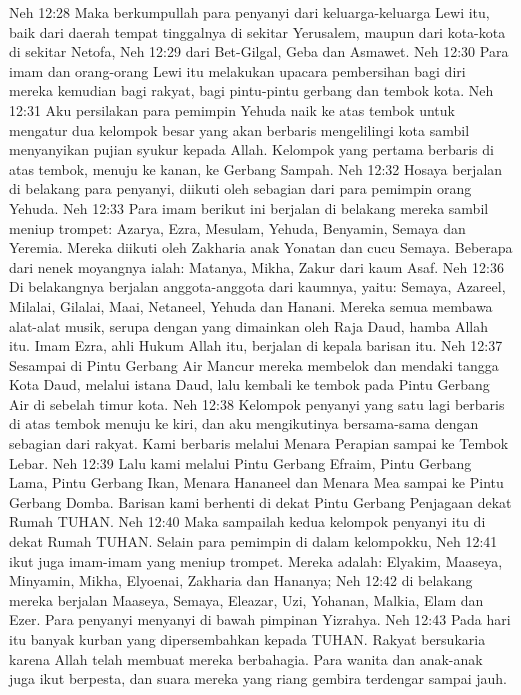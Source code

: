 Neh 12:28  Maka berkumpullah para penyanyi dari keluarga-keluarga Lewi itu, baik dari daerah tempat tinggalnya di sekitar Yerusalem, maupun dari kota-kota di sekitar Netofa,
Neh 12:29  dari Bet-Gilgal, Geba dan Asmawet.
Neh 12:30  Para imam dan orang-orang Lewi itu melakukan upacara pembersihan bagi diri mereka kemudian bagi rakyat, bagi pintu-pintu gerbang dan tembok kota.
Neh 12:31  Aku persilakan para pemimpin Yehuda naik ke atas tembok untuk mengatur dua kelompok besar yang akan berbaris mengelilingi kota sambil menyanyikan pujian syukur kepada Allah. Kelompok yang pertama berbaris di atas tembok, menuju ke kanan, ke Gerbang Sampah.
Neh 12:32  Hosaya berjalan di belakang para penyanyi, diikuti oleh sebagian dari para pemimpin orang Yehuda.
Neh 12:33  Para imam berikut ini berjalan di belakang mereka sambil meniup trompet: Azarya, Ezra, Mesulam, Yehuda, Benyamin, Semaya dan Yeremia. Mereka diikuti oleh Zakharia anak Yonatan dan cucu Semaya. Beberapa dari nenek moyangnya ialah: Matanya, Mikha, Zakur dari kaum Asaf.
Neh 12:36  Di belakangnya berjalan anggota-anggota dari kaumnya, yaitu: Semaya, Azareel, Milalai, Gilalai, Maai, Netaneel, Yehuda dan Hanani. Mereka semua membawa alat-alat musik, serupa dengan yang dimainkan oleh Raja Daud, hamba Allah itu. Imam Ezra, ahli Hukum Allah itu, berjalan di kepala barisan itu.
Neh 12:37  Sesampai di Pintu Gerbang Air Mancur mereka membelok dan mendaki tangga Kota Daud, melalui istana Daud, lalu kembali ke tembok pada Pintu Gerbang Air di sebelah timur kota.
Neh 12:38  Kelompok penyanyi yang satu lagi berbaris di atas tembok menuju ke kiri, dan aku mengikutinya bersama-sama dengan sebagian dari rakyat. Kami berbaris melalui Menara Perapian sampai ke Tembok Lebar.
Neh 12:39  Lalu kami melalui Pintu Gerbang Efraim, Pintu Gerbang Lama, Pintu Gerbang Ikan, Menara Hananeel dan Menara Mea sampai ke Pintu Gerbang Domba. Barisan kami berhenti di dekat Pintu Gerbang Penjagaan dekat Rumah TUHAN.
Neh 12:40  Maka sampailah kedua kelompok penyanyi itu di dekat Rumah TUHAN. Selain para pemimpin di dalam kelompokku,
Neh 12:41  ikut juga imam-imam yang meniup trompet. Mereka adalah: Elyakim, Maaseya, Minyamin, Mikha, Elyoenai, Zakharia dan Hananya;
Neh 12:42  di belakang mereka berjalan Maaseya, Semaya, Eleazar, Uzi, Yohanan, Malkia, Elam dan Ezer. Para penyanyi menyanyi di bawah pimpinan Yizrahya.
Neh 12:43  Pada hari itu banyak kurban yang dipersembahkan kepada TUHAN. Rakyat bersukaria karena Allah telah membuat mereka berbahagia. Para wanita dan anak-anak juga ikut berpesta, dan suara mereka yang riang gembira terdengar sampai jauh.
